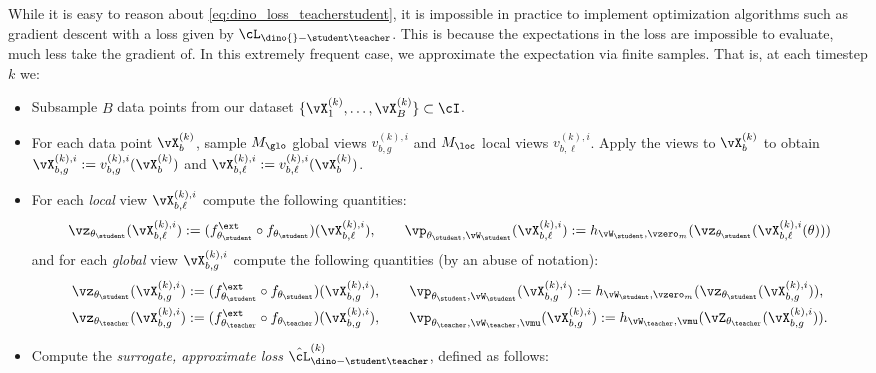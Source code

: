 \documentclass[../../book-main.tex]{subfiles}
\begin{document}
While it is easy to reason about \eqref{eq:dino_loss_teacherstudent}, it is impossible in practice to implement optimization algorithms such as gradient descent with a loss given by \(\cL_{\dino{}-\student\teacher}\). This is because the expectations in the loss are impossible to evaluate, much less take the gradient of. In this extremely frequent case, we approximate the expectation via finite samples. That is, at each timestep \(k\) we:
\begin{itemize}
    \item Subsample \(B\) data points from our dataset \(\{\vX_{1}^{(k)}, \dots, \vX_{B}^{(k)}\} \subset \cI\).
    \item For each data point \(\vX_{b}^{(k)}\), sample \(M_{\glo}\) global views \(v_{b, g}^{(k), i}\) and \(M_{\loc}\) local views \(v_{b, \ell}^{(k), i}\). Apply the views to \(\vX_{b}^{(k)}\) to obtain \(\vX_{b, g}^{(k), i} := v_{b, g}^{(k), i}(\vX_{b}^{(k)})\) and \(\vX_{b, \ell}^{(k), i} := v_{b, \ell}^{(k), i}(\vX_{b}^{(k)})\).
    \item For each \textit{local} view \(\vX_{b, \ell}^{(k), i}\) compute the following quantities:
    \begin{equation}
        \vz_{\theta_{\student}}(\vX_{b, \ell}^{(k), i}) := (f_{\theta_{\student}}^{\ext} \circ f_{\theta_{\student}})(\vX_{b, \ell}^{(k), i}), \qquad \vp_{\theta_{\student}, \vW_{\student}}(\vX_{b, \ell}^{(k), i}) := h_{\vW_{\student}, \vzero_{m}}(\vz_{\theta_{\student}}(\vX_{b, \ell}^{(k), i}(\theta)))
    \end{equation}
    and for each \textit{global} view \(\vX_{b, g}^{(k), i}\) compute the following quantities (by an abuse of notation):
    \begin{align}
        &\vz_{\theta_{\student}}(\vX_{b, g}^{(k), i}) := (f_{\theta_{\student}}^{\ext} \circ f_{\theta_{\student}})(\vX_{b, g}^{(k), i}), \qquad \vp_{\theta_{\student}, \vW_{\student}}(\vX_{b, g}^{(k), i}) := h_{\vW_{\student}, \vzero_{m}}(\vz_{\theta_{\student}}(\vX_{b, g}^{(k), i})), \\
        &\vz_{\theta_{\teacher}}(\vX_{b, g}^{(k), i}) := (f_{\theta_{\teacher}}^{\ext} \circ f_{\theta_{\teacher}})(\vX_{b, g}^{(k), i}), \qquad \vp_{\theta_{\teacher}, \vW_{\teacher}, \vmu}(\vX_{b, g}^{(k), i}) := h_{\vW_{\teacher}, \vmu}(\vZ_{\theta_{\teacher}}(\vX_{b, g}^{(k), i})).
    \end{align}
    \item Compute the \textit{surrogate, approximate loss} \(\hat{\cL}_{\dino-\student\teacher}^{(k)}\), defined as follows: 

\end{itemize}
\end{document}
